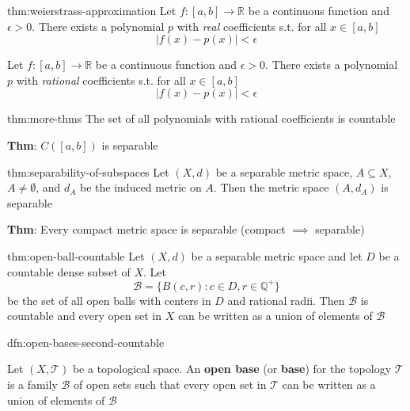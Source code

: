 \documentclass[landscape, 8pt]{extarticle}
\begin{document}
\begin{multicols}{3}
\begin{thm}{thm:weierstrass-approximation}{}
    Let $f : [a, b]\to \mathbb{R}$ be a continuous function and $\epsilon > 0$. There exists a polynomial $p$ with \textit{real} coefficients s.t. for all $x\in [a,b]$
    \[\lvert f(x) - p(x) \rvert < \epsilon\]

    \longrule{0.08ex}
    Let $f : [a,b]\to \mathbb{R}$ be a continuous function and $\epsilon > 0$. There exists a polynomial $p$ with \textit{rational} coefficients s.t. for all $x\in [a,b]$
    \[\lvert f(x) - p(x) \rvert < \epsilon\]
\end{thm}

\begin{thm}{thm:more-thms}{}
    The set of all polynomials with rational coefficients is countable
    
    \textbf{Thm}: $C([a,b])$ is separable
\end{thm}

\begin{thm}{thm:separability-of-subspaces}{}
    Let $(X, d)$ be a separable metric space, $A \subseteq X$, $A \ne \emptyset$, and $d_{A}$ be the induced metric on $A$. Then the metric space $(A, d_{A})$ is separable

    \longrule{0.08ex}
    \textbf{Thm}: Every compact metric space is separable (compact $\implies$ separable)
\end{thm}

\begin{thm}{thm:open-ball-countable}{}
    Let $(X, d)$ be a separable metric space and let $D$ be a countable dense subset of $X$. Let
    \[\mathcal{B} = \{B(c, r): c\in D, r\in \mathbb{Q}^{+}\}\]
    be the set of all open balls with centers in $D$ and rational radii. Then $\mathcal{B}$ is countable and every open set in $X$ can be written as a union of elements of $\mathcal{B}$
\end{thm}

\begin{dfn}{dfn:open-bases-second-countable}{}

    Let $(X, \mathcal{T})$ be a topological space. An \textbf{open base} (or \textbf{base}) for the topology $\mathcal{T}$ is a family $\mathcal{B}$ of open sets such that every open set in $\mathcal{T}$ can be written as a union of elements of $\mathcal{B}$


\end{dfn}
\end{multicols}
\end{document}
